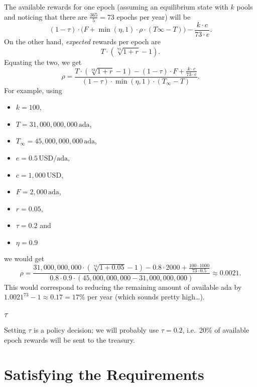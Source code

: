 \documentclass[11pt,a4paper]{article}
\begin{document}
The available rewards for one epoch (assuming an equilibrium state with
\(k\) pools and noticing that there are \(\frac{365}{5}=73\) epochs per
year) will be \[
    \left(1-\tau\right)\cdot\bigl(F + \min(\eta,1)\cdot\rho\cdot\left(T\infty - T\right)\bigr) - \frac{k\cdot c}{73\cdot e}.
\] On the other hand, \emph{expected} rewards per epoch are \[
    T\cdot\left(\sqrt[73]{1+r}-1\right).
\] Equating the two, we get \[
    \rho=\frac{T\cdot\left(\sqrt[73]{1+r}-1\right)-(1-\tau)\cdot F+\frac{k\cdot c}{73\cdot e}}
    {\left(1-\tau\right)\cdot\min(\eta,1)\cdot\left(T_\infty-T\right)}.
\] For example, using

\begin{itemize}
\item
  \(k=100\),
\item
  \(T=31,000,000,000\,\mathrm{ada}\),
\item
  \(T_\infty=45,000,000,000\,\mathrm{ada}\),
\item
  \(e=0.5\,\mathrm{USD/ada}\),
\item
  \(c=1,000\,\mathrm{USD}\),
\item
  \(F=2,000\,\mathrm{ada}\),
\item
  \(r=0.05\),
\item
  \(\tau=0.2\) and
\item
  \(\eta=0.9\)
\end{itemize}

we would get \[
    \rho=\frac
        {31,000,000,000\cdot\left(\sqrt[73]{1+0.05}-1\right)-0.8\cdot 2000+\frac{100\cdot 1000}{73\cdot 0.5}}
        {0.8\cdot 0.9\cdot\left(45,000,000,000 - 31,000,000,000\right)}
    \approx
    0.0021.
\] This would correspond to reducing the remaining amount of available
ada by \({1.0021}^{73}-1\approx 0.17=17\%\) per year (which sounds
pretty high\ldots).

\subsubsection{\texorpdfstring{\(\tau\)}{\textbackslash{}tau}}

Setting \(\tau\) is a policy decision; we will probably use
\(\tau=0.2\), i.e.~20\% of available epoch rewards will be sent to the
treasury.

\section{Satisfying the Requirements}
\label{satisfying-the-requirements}
\end{document}
